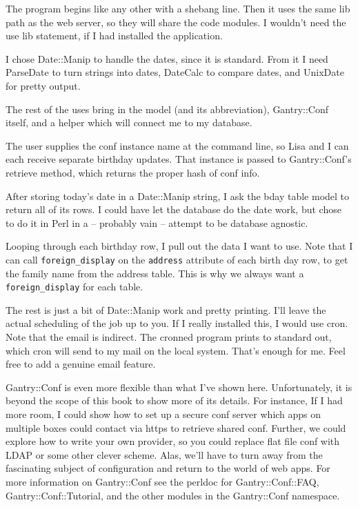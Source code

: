The program begins like any other with a shebang line.  Then it uses the
same lib path as the web server, so they will share the code modules.
I wouldn't need the use lib statement, if I had installed the application.

I chose Date::Manip to handle the dates, since it is standard.  From it
I need ParseDate to turn strings into dates, DateCalc to compare dates,
and UnixDate for pretty output.

The rest of the uses bring in the model (and its abbreviation),
Gantry::Conf itself, and a helper which will connect me to my database.

The user supplies the conf instance name at the command line, so Lisa
and I can each receive separate birthday updates.  That instance is
passed to Gantry::Conf's retrieve method, which returns the proper hash
of conf info.

After storing today's date in a Date::Manip string, I ask the bday
table model to return all of its rows.  I could have let the database do
the date work, but chose to do it in Perl in a -- probably vain -- attempt
to be database agnostic.

Looping through each birthday row, I pull out the data I want to use.
Note that I can call \verb+foreign_display+ on the \verb+address+ attribute
of each birth day row, to get the family name from the address table.
This is why we always want a \verb+foreign_display+ for each table.

The rest is just a bit of Date::Manip work and pretty printing.
I'll leave the actual scheduling of the job up to you.  If I really installed
this, I would use cron.  Note that the email is indirect.  The cronned
program prints to standard out, which cron will send to my mail on the local
system.  That's enough for me.  Feel free to add a genuine email feature.

Gantry::Conf is even more flexible than what I've shown here.  Unfortunately,
it is beyond the scope of this book to show more of its details.  For instance,
If I had more room, I could show how to set up a secure conf server which apps
on multiple boxes could contact via https to retrieve shared conf.  Further,
we could explore how to write your own provider, so you could replace flat
file conf with LDAP or some other clever scheme.  Alas, we'll have to turn
away from the fascinating subject of configuration and return to the world
of web apps.  For more information on Gantry::Conf see the perldoc for
Gantry::Conf::FAQ, Gantry::Conf::Tutorial, and the other modules in the
Gantry::Conf namespace.
